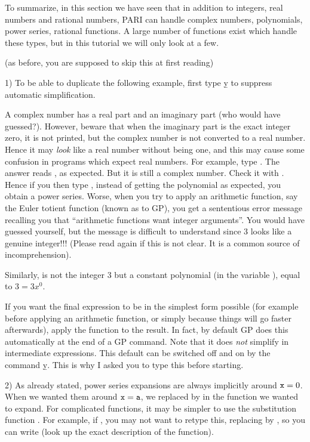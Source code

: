 To summarize, in this section we have seen that in addition to integers, real
numbers and rational numbers, PARI can handle complex numbers, polynomials,
power series, rational functions. A large number of functions exist which
handle these types, but in this tutorial we will only look at a few.

 (as before, you are supposed to skip this
at first reading)

1) To be able to duplicate the following example, first type \b{y} to
suppress automatic simplification.

A complex number has a real part and an imaginary part (who would have
guessed?). However, beware that when the imaginary part is the exact integer
zero, it is not printed, but the complex number is not converted to a real
number. Hence it may {\it look\/} like a real number without being one, and
this may cause some confusion in programs which expect real numbers. For
example, type . The answer reads , as expected. But
it is still a complex number. Check it with . Hence if you then
type , instead of getting the polynomial
 as expected, you obtain a power series.
Worse, when you try to apply an arithmetic function, say the Euler totient
function (known as  to GP), you get a sententious error message
recalling you that ``arithmetic functions want integer arguments''. You would
have guessed yourself, but the message is difficult to understand since 3 looks
like a genuine integer!!! (Please read again if this is not clear. It is a
common source of incomprehension).

Similarly,  is not the integer 3 but a constant polynomial
(in the variable ), equal to $3 = 3x^0$.

If you want the final expression to be in the simplest form possible (for
example before applying an arithmetic function, or simply because things will
go faster afterwards), apply the function  to the result. In
fact, by default GP does this automatically at the end of a GP command. Note
that it does {\it not\/} simplify in intermediate expressions. This default
can be switched off and on by the command \b{y}. This is why I asked you to
type this before starting.

2) As already stated, power series expansions are always implicitly around
${\tt x}=0$. When we wanted them around ${\tt x}={\tt a}$, we replaced
 by  in the function we wanted to expand. For complicated
functions, it may be simpler to use the substitution function .
For example, if ,
you may not want to retype this, replacing  by , so you can
write  (look up the exact description of the
 function).


